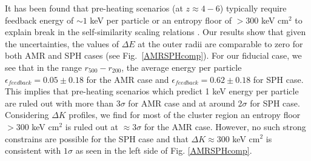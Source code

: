 \documentclass[a4paper,fleqn,usenatbib]{mnras}
\begin{document}
It has been found that pre-heating scenarios (at $z\approx4-6$) typically require feedback energy of $\sim1$ keV per particle or an  entropy floor of $>300$ keV cm$^2$  to explain break in the self-similarity scaling relations \citep{Borgani2001,Tozzi2001,Pipino2002,Finoguenov2003}.
Our results show that given the uncertainties, the values of $\Delta E$ at the outer radii are comparable to zero for both AMR and SPH cases (see Fig.~\ref{AMRSPHcomp}). For our fiducial case, we see that in the range $r_{500}-r_{200}$, the average energy per particle $\epsilon_{feedback}=0.05\pm0.18$ for the AMR case and $\epsilon_{feedback}=0.62\pm0.18$ for SPH case.
This implies that pre-heating scenarios  which predict 1 keV energy per particle are ruled out with more than 3$\sigma$ for AMR case and at around 2$\sigma$ for SPH case. Considering $\Delta K$ profiles, we find for most of the cluster region an entropy floor $>300$ keV cm$^2$ is ruled out at $\approx 3\sigma$ for the AMR case. However, no such strong constrains are possible for the SPH case and that $\Delta K\approx300$ keV cm$^2$ is consistent with $1\sigma$ as seen in the left side of Fig. \ref{AMRSPHcomp}. 
\end{document}
